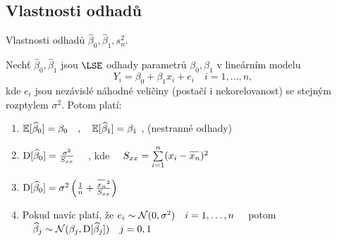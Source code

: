 \subsection{Vlastnosti odhadů}
Vlastnosti odhadů $ \widehat{\beta}_{0} , \widehat{\beta}_{1} ,  s_{n}^{2} $.
\begin{theorem}
   Nechť $ \widehat{\beta}_{0} , \widehat{\beta}_{1} $ jsou $ \LSE $ odhady parametrů $ \beta_{0}, \beta_{1} $ v lineárním modelu 
   $$
   		Y_{i} = \beta_{0} + \beta_{1} x_{i} + e_{i} \quad i = 1 , \dots , n ,
   $$
   kde $ e_{i} $ jsou nezávislé náhodné veličiny (postačí i nekorelovanost) se stejným rozptylem $ \sigma^{2} $. Potom platí:
   \begin{enumerate}
  \item $ \mathbb{E} [ \widehat{\beta}_{0} ] = \beta_{0} \quad , \quad \mathbb{E} [ \widehat{\beta}_{1} ] = \beta_{1} $ , (nestranné odhady)
  \item $  \mathrm{D} [ \widehat{\beta}_{0} ] = \frac{\sigma^{2}}{S_{xx}}  \quad $ , kde $ \quad S_{xx} = \sumin (x_{i} - \oxnn )^{2} $
  \item $ \D [ \widehat{\beta}_{0} ] = \sigma^{2} \left( \frac{1}{n} + \frac{\oxnn ^{2}}{S_{xx}} \right) $
  \item Pokud navíc platí, že $ e_{i} \sim \mathcal{N} ( 0 , \sigma^{2} ) \quad i = 1 , \dots , n \quad $ potom $ \quad \widehat{\beta}_{j} \sim \mathcal{N} ( \beta_{j} , \mathrm{D} [ \widehat{\beta}_{j} ] ) \quad j = 0 , 1  $ 
\end{enumerate}
\end{theorem}

